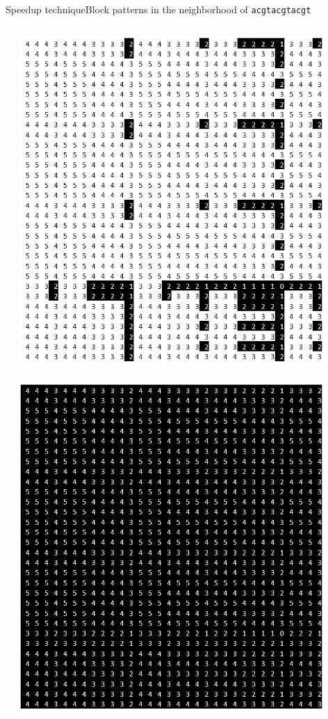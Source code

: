 \documentclass[pdf,xcolor={dvipsnames}]{beamer}
\begin{document}
\begin{frame}{Speedup technique}{Block patterns in the neighborhood of \texttt{acgtacgtacgt}}
\begin{columns}
\begin{column}{0.33\textwidth}
			\end{column}
			\begin{column}{0.33\textwidth}
				\includegraphics[width=0.9\textwidth]{img/2.png}\\\ \\
				\includegraphics[width=0.9\textwidth]{img/5.png}
			\end{column}
		\end{columns}
	\end{frame}
\end{document}
